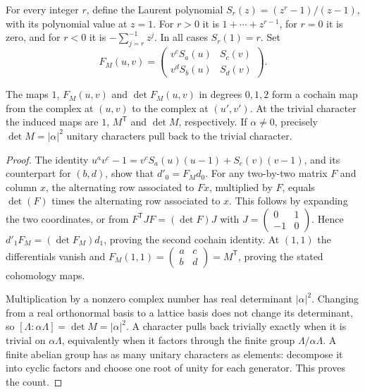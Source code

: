 For every integer $r$, define the Laurent polynomial
$S_r(z)=(z^r-1)/(z-1)$, with its polynomial value at $z=1$.
For $r>0$ it is $1+\cdots+z^{r-1}$, for $r=0$ it is zero, and
for $r<0$ it is $-\sum_{j=r}^{-1}z^j$.  In all cases $S_r(1)=r$.
Set
\[
 F_M(u,v)=
 \begin{pmatrix}
 v^cS_a(u)&S_c(v)\\
 v^dS_b(u)&S_d(v)
 \end{pmatrix}.
\]

\begin{theorem}
The maps $1$, $F_M(u,v)$ and $\det F_M(u,v)$ in degrees $0,1,2$
form a cochain map from the complex at $(u,v)$ to the complex at
$(u',v')$.  At the trivial character the induced maps are
$1$, $M^{\mathsf T}$ and $\det M$, respectively.
If $\alpha\ne0$, precisely $\det M=|\alpha|^2$ unitary characters
pull back to the trivial character.
\end{theorem}
\begin{proof}
The identity
$u^av^c-1=v^cS_a(u)(u-1)+S_c(v)(v-1)$, and its counterpart for
$(b,d)$, show that $d'_0=F_Md_0$.  For any two-by-two matrix $F$ and
column $x$, the alternating row associated to $Fx$, multiplied by $F$,
equals $\det(F)$ times the alternating row associated to $x$.
This follows by expanding the two coordinates, or from
$F^{\mathsf T}JF=(\det F)J$ with
$J=\left(\begin{smallmatrix}0&1\\-1&0\end{smallmatrix}\right)$.
Hence $d'_1F_M=(\det F_M)d_1$, proving the second cochain identity.
At $(1,1)$ the differentials vanish and
$F_M(1,1)=\left(\begin{smallmatrix}a&c\\b&d\end{smallmatrix}\right)
=M^{\mathsf T}$, proving the stated cohomology maps.

Multiplication by a nonzero complex number has real determinant
$|\alpha|^2$.  Changing from a real orthonormal basis to a lattice basis
does not change its determinant, so
$[\Lambda:\alpha\Lambda]=\det M=|\alpha|^2$.
A character pulls back trivially exactly when it is trivial on
$\alpha\Lambda$, equivalently when it factors through the finite group
$\Lambda/\alpha\Lambda$.  A finite abelian group has as many unitary
characters as elements: decompose it into cyclic factors and choose one
root of unity for each generator.  This proves the count.
\end{proof}

